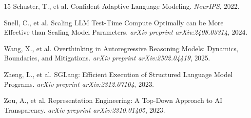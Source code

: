 \documentclass[10pt,twocolumn]{article}
\begin{document}
\begin{thebibliography}{15}
Schuster, T., et al.
\newblock Confident Adaptive Language Modeling.
\newblock \emph{NeurIPS}, 2022.

Snell, C., et al.
\newblock Scaling LLM Test-Time Compute Optimally can be More Effective than Scaling Model Parameters.
\newblock \emph{arXiv preprint arXiv:2408.03314}, 2024.

Wang, X., et al.
\newblock Overthinking in Autoregressive Reasoning Models: Dynamics, Boundaries, and Mitigations.
\newblock \emph{arXiv preprint arXiv:2502.04419}, 2025.

Zheng, L., et al.
\newblock SGLang: Efficient Execution of Structured Language Model Programs.
\newblock \emph{arXiv preprint arXiv:2312.07104}, 2023.

Zou, A., et al.
\newblock Representation Engineering: A Top-Down Approach to AI Transparency.
\newblock \emph{arXiv preprint arXiv:2310.01405}, 2023.

\end{thebibliography}
\end{document}
